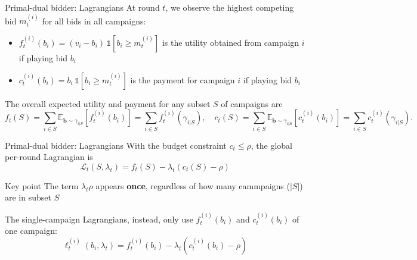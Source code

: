 \begin{frame}{Primal-dual bidder: Lagrangians}
    At round $t$, we observe the highest competing bid $m_t^{(i)}$ for all bids in all campaigns:
    \begin{itemize}
        \item $f_t^{(i)}(b_i) = (v_i - b_i)\,\mathds{1}\left[ b_i \geq m_t^{(i)} \right]$ is the utility obtained from campaign $i$ if playing bid $b_i$
        \item $c_t^{(i)}(b_i) = b_i\,\mathds{1}\left[ b_i \geq m_t^{(i)} \right]$ is the payment for campaign $i$ if playing bid $b_i$
    \end{itemize}

    \vspace{1cm}

    The overall expected utility and payment for any subset $S$ of campaigns are
    \[f_t(S) = \sum_{i \in S} \mathbb{E}_{\mathbf{b} \sim \gamma_{i|S}}\left[ f_t^{(i)}(b_i) \right] = \sum_{i \in S} f_t^{(i)}(\gamma_{i|S}), \quad c_t(S) = \sum_{i \in S} \mathbb{E}_{\mathbf{b} \sim \gamma_{i|S}}\left[ c_t^{(i)}(b_i) \right] = \sum_{i \in S} c_t^{(i)}(\gamma_{i|S}).\]
\end{frame}

\begin{frame}{Primal-dual bidder: Lagrangians}
    With the budget constraint $c_t \leq \rho$, the global per-round Lagrangian is
    \[\boxed{\mathcal{L}_t(S, \lambda_t) = f_t(S) - \lambda_t(c_t(S) - \rho)}\]

    \vspace{-0.2cm}

    \begin{alertblock}{Key point}
        The term $\lambda_t\rho$ appears \textbf{once}, regardless of
        how many cammpaigns ($|S|$) are in subset $S$
    \end{alertblock}

    \vspace{0.2cm}

    The single-campaign Lagrangians, instead, only use $f_t^{(i)}(b_i)$ and $c_t^{(i)}(b_i)$ of one campaign:
    \[\boxed{\ell_t^{(i)}(b_i, \lambda_t) = f_t^{(i)}(b_i) - \lambda_t (c_t^{(i)}(b_i) - \rho)}\]
\end{frame}

